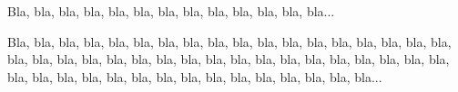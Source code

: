 

Bla, bla, bla, bla, bla, bla, bla, bla, bla, bla, bla, bla, bla...

\bigskip %


Bla, bla, bla, bla, bla, bla, bla, bla, bla, bla, bla, bla, bla,
bla, bla, bla, bla, bla, bla, bla, bla, bla, bla, bla, bla, bla,
bla, bla, bla, bla, bla, bla, bla, bla, bla, bla, bla, bla, bla,
bla, bla, bla, bla, bla, bla, bla, bla, bla, bla, bla, bla...
